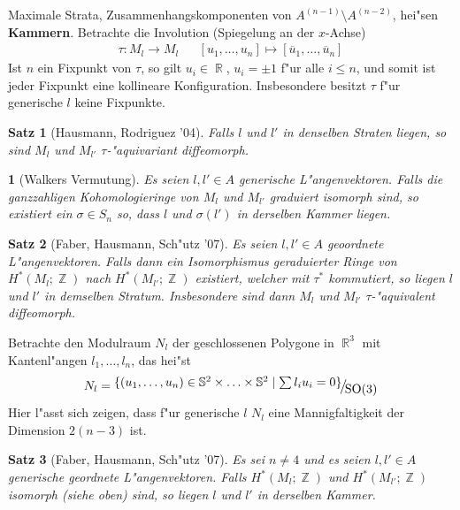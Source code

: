 \documentclass[paper=A4, twoside, chapterprefix=true, bibliography=totoc, headsepline]{scrbook}
\DeclareMathOperator{\R}{\mathbb{R}}
\DeclareMathOperator{\Z}{\mathbb{Z}}
\renewcommand{\S}{\mathbb{S}}
\DeclareMathOperator{\SO}{SO} %
\newcommand{\X}{\times}
\newcommand{\FakRaum}[2]{
	\raisebox{0.7ex}{\ensuremath{#1}}
	\ensuremath{\mkern-3mu}\big/\ensuremath{\mkern-3mu}
	\raisebox{-0.6ex}{\ensuremath{#2}}}
\theoremstyle{nonumberbreak}
\newtheorem{satz}{Satz}
\theoremstyle{emptybreak}
\newtheorem{emptythm}{}%
\theoremstyle{break}
\newcommand{\CmIndex}[2][]{\ifthenelse{\isempty{#1}}{\index{#2}}{\index{#1}}#2}
\newcommand{\CmMark}[2][]{\textbf{\CmIndex[#1]{#2}}}
\begin{document}
Maximale Strata, Zusammenhangskomponenten von $A^{(n-1)} \setminus A^{(n-2)}$, hei"sen \CmMark[Kammer]{Kammern}.
Betrachte die Involution (Spiegelung an der $x$-Achse)
\begin{align*}
	\tau: M_l \to M_l && [u_1, \ldots, u_n] \mapsto [\overline{u}_1, \ldots, \overline{u}_n]
\end{align*}
Ist $n$ ein Fixpunkt von $\tau$, so gilt $u_i \in \R$, $u_i = \pm 1$ f"ur alle $i \le n$, und somit ist jeder Fixpunkt eine kollineare Konfiguration.
Insbesondere besitzt $\tau$ f"ur generische $l$ keine Fixpunkte.

\begin{satz}[Hausmann, Rodriguez '04]
Falls $l$ und $l'$ in denselben Straten liegen, so sind $M_l$ und $M_{l'}$ $\tau$-"aquivariant diffeomorph.
\end{satz}

\begin{emptythm}[Walkers Vermutung]
Es seien $l, l' \in A$ generische L"angenvektoren.
Falls die ganzzahligen Kohomologieringe von $M_l$ und $M_{l'}$ graduiert isomorph sind, so existiert ein $\sigma \in S_n$ so, dass $l$ und $\sigma(l')$ in derselben Kammer liegen.
\end{emptythm}

\begin{satz}[Faber, Hausmann, Sch"utz '07]
Es seien $l, l' \in A$ geoordnete L"angenvektoren.
Falls dann ein Isomorphismus geraduierter Ringe von $H^*(M_l; \Z)$ nach $H^*(M_{l'}; \Z)$ existiert, welcher mit $\tau^*$ kommutiert, so liegen $l$ und $l'$ in demselben Stratum.
Insbesondere sind dann $M_l$ und $M_{l'}$ $\tau$-"aquivalent diffeomorph.
\end{satz}

Betrachte den Modulraum $N_l$ der geschlossenen Polygone in $\R^3$ mit Kantenl"angen $l_1, \ldots, l_n$, das hei"st
\begin{align*}
	N_l = \FakRaum{\{(u_1, \ldots, u_n) \in \S^2 \X \ldots \X \S^2 \mid \sum l_i u_i = 0\}}{\SO(3)}
\end{align*}
Hier l"asst sich zeigen, dass f"ur generische $l$ $N_l$ eine Mannigfaltigkeit der Dimension $2 (n - 3)$ ist.

\begin{satz}[Faber, Hausmann, Sch"utz '07]
Es sei $n \ne 4$ und es seien $l, l' \in A$ generische geordnete L"angenvektoren.
Falls $H^*(M_l; \Z)$ und $H^*(M_{l'}; \Z)$ isomorph (siehe oben) sind, so liegen $l$ und $l'$ in derselben Kammer.
\end{satz}
\end{document}
